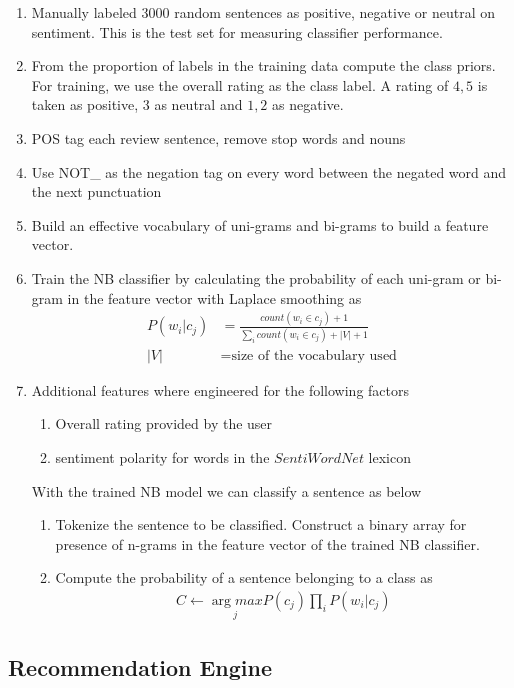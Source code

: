\documentclass[twoside,12pt]{article}
\begin{document}
\begin{enumerate}
\item
Manually labeled 3000 random sentences as positive, negative or neutral on sentiment. This is the test set for measuring classifier performance.
\item
From the proportion of labels in the training data compute the class priors. For training, we use the overall rating as the class label. A rating of $4,5$ is taken as positive, $3$ as neutral and $1, 2$ as negative.
\item
POS tag each review sentence, remove stop words and nouns
\item
Use NOT\_ as the negation tag on every word between the negated word and the next punctuation
\item
Build an effective vocabulary of uni-grams and bi-grams to build a feature vector.
\item
Train the NB classifier by calculating the probability of each uni-gram or bi-gram in the feature vector with Laplace smoothing as
\begin{align}
P(w_i|c_j) &= \frac{ count(w_i \in c_j) + 1}{\sum_i count(w_i \in c_j) + |V|+1} \label{nb_p1}\\
|V| &= \text{size of the vocabulary used}
\end{align} 
\item
Additional features where engineered for the following factors 
\begin{enumerate}
\item
Overall rating provided by the user 
\item
sentiment polarity for words in the $SentiWordNet$ lexicon
\end{enumerate}
With the trained NB model we can classify a sentence as below
\begin{enumerate}
\item
Tokenize the sentence to be classified. Construct a binary array for presence of n-grams in the feature vector of the trained NB classifier.
\item
Compute the probability of a sentence belonging to a class as
\begin{align}
C \gets \underset{j}{\arg max} P(c_j) \prod_{i} P(w_i|c_j) \label{nb_p2}	
\end{align}
\end{enumerate}
\end{enumerate}


\subsection{Recommendation Engine}
\end{document}
